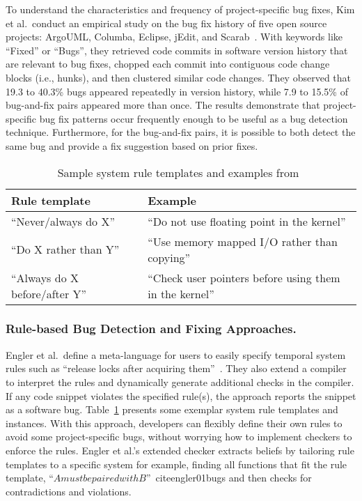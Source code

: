 To understand the characteristics and frequency of project-specific bug fixes, Kim et al.~conduct an empirical study on the bug fix history of five open source projects: ArgoUML, Columba, Eclipse, jEdit, and Scarab~\cite{Kim2006:MBF}. With keywords like ``Fixed'' or ``Bugs'', they retrieved code commits in software version history that are relevant to bug fixes, chopped each commit into contiguous code change blocks (i.e., hunks), and then clustered similar code changes. They observed that 19.3 to 40.3\% bugs appeared repeatedly in version history, while 7.9 to 15.5\% of bug-and-fix pairs appeared more than once. The results demonstrate that project-specific bug fix patterns occur frequently enough to be useful as a bug detection technique. Furthermore, for the bug-and-fix pairs, it is possible to both detect the same bug and provide a fix suggestion based on prior fixes. 

\begin{table}[]
\centering
\caption{Sample system rule templates and examples from~\cite{Engler2000:CSR}}
\label{tab:rule}
\begin{tabular}{l|l}
\toprule
Rule template                  & Example                                                 \\ \hline
``Never/always do X''          & ``Do not use floating point in the kernel''             \\\hline
``Do X rather than Y''         & ``Use memory mapped I/O rather than copying''           \\ \hline
``Always do X before/after Y'' & ``Check user pointers before using them in the kernel''\\
\bottomrule
\end{tabular}
\end{table} 

\subsubsection{Rule-based Bug Detection and Fixing Approaches.}
Engler et al.~define a meta-language for users to easily specify temporal system rules such as ``release locks after acquiring them''~\cite{Engler2000:CSR}. They also extend a compiler to interpret the rules and dynamically generate additional checks in the compiler. If any code snippet violates the specified rule(s), the approach reports the snippet as a software bug. Table~\ref{tab:rule} presents some exemplar system rule templates and instances. 
With this approach, developers can flexibly define their own rules to avoid some project-specific bugs, without worrying how to implement checkers to enforce the rules. Engler et al.'s extended checker extracts beliefs by tailoring rule templates to a specific system \textemdash for example, finding all functions that fit the rule template, ``$A must be paired with B$''~cite{engler01bugs} and then checks for contradictions and violations. 

